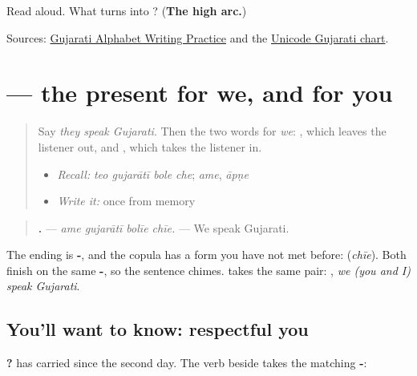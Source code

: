 \begin{tcolorbox}[breakable,colback=teal!4,colframe=teal!35!black,title={Before you move on}]
Read \textbf{  } aloud. What turns \textbf{} into \textbf{}? (\textbf{The high arc.})

Sources: \href{https://www.t30apps.com/gujarati-alphabet-writing/}{Gujarati Alphabet Writing Practice} and the \href{https://www.unicode.org/charts/PDF/U0A80.pdf}{Unicode Gujarati chart}.
\end{tcolorbox}
\section[\texorpdfstring{\gu{અમે} … \gu{બોલીએ} \gu{છીએ} (ame … bolīe chīe)}{અમે … બોલીએ છીએ (ame … bolīe chīe)}]{    — the present for we, and for you}

\label{lesson:GU-C145-bolie-chie}



\begin{quote}
Say \emph{they speak Gujarati}. Then the two words for \emph{we}: \textbf{}, which leaves the listener out, and \textbf{}, which takes the listener in.

\begin{itemize}
\raggedright
  \item \emph{Recall:} \emph{teo gujarātī bole che}; \emph{ame}, \emph{āpṇe}
  \item \emph{Write it:} \textbf{} once from memory
\end{itemize}
\end{quote}

\begin{grammarlens}[title={Grammar Lens: we}]
\begin{quote}
\textbf{   .} — \emph{ame gujarātī bolīe chīe.} — We speak Gujarati.
\end{quote}

The ending is \textbf{-}, and the copula has a form you have not met before: \textbf{} (\emph{chīe}). Both finish on the same \textbf{-}, so the sentence chimes. \textbf{} takes the same pair: \textbf{   }, \emph{we (you and I) speak Gujarati}.
\end{grammarlens}

\subsection*{You'll want to know: respectful you}
\textbf{  ?} has carried \textbf{} since the second day. The verb beside \textbf{} takes the matching \textbf{-}:

